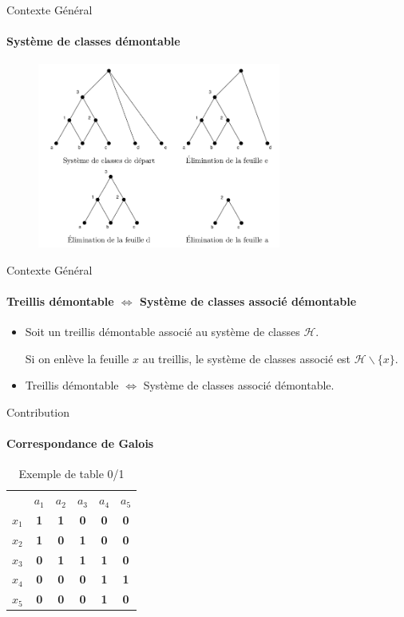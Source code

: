 \documentclass{beamer}
\begin{document}
  \begin{frame}{Contexte Général}
  \framesubtitle{Système de classes démontable}
   \begin{figure}
	\includegraphics[width=8cm]{images/e_sc.png} 
    \end{figure}
  \end{frame}

  \begin{frame}{Contexte Général}
  \framesubtitle{Treillis démontable $\Leftrightarrow$ Système de classes associé démontable}
\begin{itemize}
 \item   Soit un treillis démontable associé au système de classes $\mathcal{H}$.

  Si on enlève la feuille $x$ au treillis, le système de classes associé est $\mathcal{H} \backslash \{x\}$.
 \item Treillis démontable $\Leftrightarrow$ Système de classes associé démontable.
\end{itemize}


 
  \end{frame}
  \begin{frame}{Contribution}
  \framesubtitle{Correspondance de Galois}
\begin{table}[htb]
  \centering

\begin{tabular}{lccccc}
 & $a_1$ & $a_2$ & $a_3$ & $a_4$ & $a_5$\\
$x_1$ & \textbf{1} & \textbf{1} & \textbf{0} & \textbf{0} & \textbf{0}\\
$x_2$ & \textbf{1} & \textbf{0} & \textbf{1} & \textbf{0} & \textbf{0}\\
$x_3$ & \textbf{0} & \textbf{1} & \textbf{1} & \textbf{1} & \textbf{0}\\
$x_4$ & \textbf{0} & \textbf{0} & \textbf{0} & \textbf{1} & \textbf{1}\\
$x_5$ & \textbf{0} & \textbf{0} & \textbf{0} & \textbf{1} & \textbf{0}

\end{tabular}
\caption{Exemple de table 0/1  }
\end{table}
  \end{frame}
\end{document}
